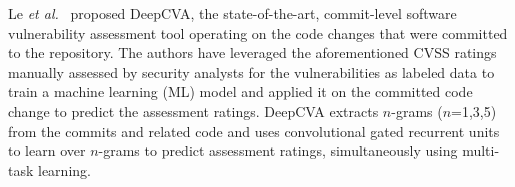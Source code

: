 %

Le {\em et al.}~\cite{deepCVA-ase21} proposed DeepCVA, the
state-of-the-art, commit-level software vulnerability assessment tool
operating on the code changes that were committed to the repository.
The authors have leveraged the aforementioned CVSS ratings manually
assessed by security analysts for the vulnerabilities as labeled data
to train a machine learning (ML) model and applied it on the committed
code change to predict the assessment ratings.
%
DeepCVA extracts $n$-grams ($n$=1,3,5) from the commits and related
code and uses convolutional gated recurrent units~\cite{fu2016using}
to learn over $n$-grams to predict assessment ratings, simultaneously
using multi-task learning. 



